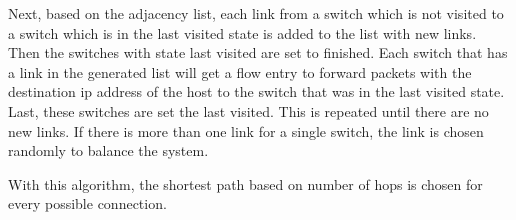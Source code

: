 \documentclass[paper=a4, fontsize=11pt]{scrartcl} %
\numberwithin{equation}{section} %
\numberwithin{figure}{section} %
\numberwithin{table}{section} %
\begin{document}
Next, based on the adjacency list, each link from a switch which is not visited to a switch which is in the last visited state is added to the list with new links. Then the switches with state last visited are set to finished. Each switch that has a link in the generated list will get a flow entry to forward packets with the destination ip address of the host to the switch that was in the last visited state. Last, these switches are set the last visited. This is repeated until there are no new links. If there is more than one link for a single switch, the link is chosen randomly to balance the system.

With this algorithm, the shortest path based on number of hops is chosen for every possible connection.
\end{document}
